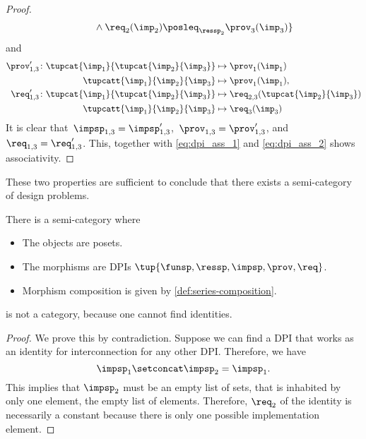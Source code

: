 \begin{proof}
\begin{equation}
\begin{aligned}
            &\qquad \wedge \req_2(\imp_2)\posleq_{\ressp_2}\prov_3(\imp_3)\}\\
        \end{aligned}
    \end{equation}
    and
    \begin{equation}
        \begin{aligned}
            \prov'_{1,3} \colon  \tupcat {\imp_{1}}{\tupcat {\imp_{2}} {\imp_{3}}}   &\mapsto\prov_{1}(\imp_{1})\\
            \tupcatt{\imp_{1}}{\imp_{2}}{\imp_{3}} &\mapsto\prov_{1}(\imp_{1}),\\
            \req'_{1,3} \colon  \tupcat {\imp_{1}}{\tupcat {\imp_{2}} {\imp_{3}}} &\mapsto\req_{2,3}(\tupcat {\imp_{2}} {\imp_{3}})\\
            \tupcatt{\imp_{1}}{\imp_{2}}{\imp_{3}}&\mapsto \req_{3}(\imp_{3})
        \end{aligned}
    \end{equation}
    It is clear that~$\impsp_{1,3}=\impsp'_{1,3}$,~$\prov_{1,3}=\prov'_{1,3}$, and~$\req_{1,3}=\req'_{1,3}$.
    This, together with \cref{eq:dpi_ass_1} and \cref{eq:dpi_ass_2} shows associativity.
\end{proof}

These two properties are sufficient to conclude that there exists a semi-category of design problems.



\begin{definition}
    \label{def:DPIcat}
    There is a semi-category \DPI where
    \begin{itemize}
        \item The objects are posets.
        \item The morphisms are DPIs $\tup{\funsp,\ressp,\impsp,\prov,\req}$.
        \item Morphism composition is given by \cref{def:series-composition}.
    \end{itemize}
\end{definition}

\begin{lemma}
    \DPI is not a category, because one cannot find identities.
\end{lemma}
\begin{proof}
    We prove this by contradiction. Suppose we can find a DPI that works as an identity for interconnection for any other DPI.
    Therefore, we have
    \begin{equation}
        \impsp_{1} \setconcat \impsp_{2} = \impsp_{1}.
    \end{equation}
    This implies that $\impsp_{2}$ must be an empty list of sets,  that is inhabited by only one element, the empty list of elements. Therefore, $\req_2$ of the identity is necessarily a constant because there is only one possible implementation element.
\end{proof}

